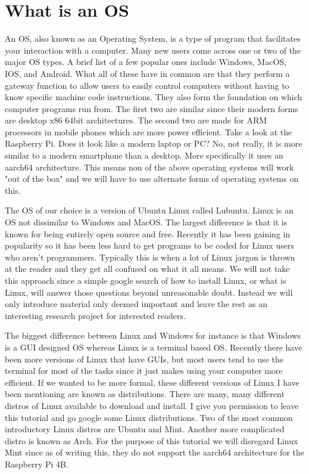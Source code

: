 \documentclass[letterpaper,12pt,notitlepage]{report} %
\begin{document}
\section{What is an OS}
An OS, also known as an Operating System, is a type of program that facilitates your interaction with a computer. Many new users come across one or two of the major OS types. A brief list of a few popular ones include Windows, MacOS, IOS, and Android. What all of these have in common are that they perform a gateway function to allow users to easily control computers without having to know specific machine code instructions. They also form the foundation on which computer programs run from. The first two are similar since their modern forms are desktop x86 64bit architectures. The second two are made for ARM processors in mobile phones which are more power efficient. Take a look at the Raspberry Pi. Does it look like a modern laptop or PC? No, not really, it is more similar to a modern smartphone than a desktop. More specifically it uses an aarch64 architecture. This means non of the above operating systems will work "out of the box" and we will have to use alternate forms of operating systems on this.

The OS of our choice is a version of Ubuntu Linux called Lubuntu. Linux is an OS not dissimilar to Windows and MacOS. The largest difference is that it is known for being entirely open source and free. Recently it has been gaining in popularity so it has been less hard to get programs to be coded for Linux users who aren't programmers. Typically this is when a lot of Linux jargon is thrown at the reader and they get all confused on what it all means. We will not take this approach since a simple google search of how to install Linux, or what is Linux, will answer those questions beyond unreasonable doubt. Instead we will only introduce material only deemed important and leave the rest as an interesting research project for interested readers. 

The biggest difference between Linux and Windows for instance is that Windows is a GUI designed OS whereas Linux is a terminal based OS. Recently there have been more versions of Linux that have GUIs, but most users tend to use the terminal for most of the tasks since it just makes using your computer more efficient. If we wanted to be more formal, these different versions of Linux I have been mentioning are known as distributions. There are many, many different distros of Linux available to download and install. I give you permission to leave this tutorial and go google some Linux distributions. Two of the most common introductory Linux distros are Ubuntu and Mint. Another more complicated distro is known as Arch. For the purpose of this tutorial we will disregard Linux Mint since as of writing this, they do not support the aarch64 architecture for the Raspberry Pi 4B. 
\end{document}
